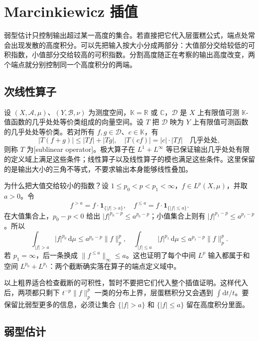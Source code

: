 \section{Marcinkiewicz 插值}
\label{b2:sec:1703}

弱型估计只控制输出超过某一高度的集合。若直接把它代入层蛋糕公式，端点处常会出现发散的高度积分。可以先把输入按大小分成两部分：大值部分交给较低的可积指数，小值部分交给较高的可积指数。分割高度随正在考察的输出高度改变，两个端点就分别控制同一个高度积分的两端。

\subsection{次线性算子}
\label{b2:subsec:170301}

设 \((X,\mathcal A,\mu)\)、\((Y,\mathcal B,\nu)\) 为测度空间，\(\mathbb K=\mathbb R\) 或 \(\mathbb C\)，\(\mathcal D\) 是 \(X\) 上有限值可测 \(\mathbb K\)-值函数的几乎处处等价类组成的向量空间。设 \(T\) 把 \(\mathcal D\) 映为 \(Y\) 上有限值可测函数的几乎处处等价类。若对所有 \(f,g\in\mathcal D\)、\(c\in\mathbb K\)，有
\[
 |T(f+g)|\leq |Tf|+|Tg|,
 \quad |T(cf)|=|c|\cdot|Tf|
 \quad\text{几乎处处},
\]
则称 \(T\) 为[sublinear operator]。极大算子在 \(L^1+L^\infty\) 等已保证输出几乎处处有限的定义域上满足这些条件；线性算子以及线性算子的模也满足这些条件。这里保留的是输出大小的三角不等式，不要求输出本身能够线性叠加。

\ProseParagraphBreak

为什么把大值交给较小的指数？设 \(1\leq p_0<p<p_1<\infty\)，\(f\in L^p(X,\mu)\)，并取 \(a>0\)。令
\[
 f^{>a}=f\cdot\mathbf1_{\{|f|>a\}},
 \quad f^{\leq a}=f\cdot\mathbf1_{\{|f|\leq a\}}.
\]
在大值集合上，\(p_0-p<0\) 给出 \(|f|^{p_0-p}\leq a^{p_0-p}\)；小值集合上则有 \(|f|^{p_1-p}\leq a^{p_1-p}\)。所以
\[
 \int_{|f|>a}|f|^{p_0}\,\mathrm d\mu
 \leq a^{p_0-p}\|f\|_p^p,
 \quad
 \int_{|f|\leq a}|f|^{p_1}\,\mathrm d\mu
 \leq a^{p_1-p}\|f\|_p^p.
\]
若 \(p_1=\infty\)，后一条换成 \(\|f^{\leq a}\|_\infty\leq a\)。这也证明了每个中间 \(L^p\) 输入都属于和空间 \(L^{p_0}+L^{p_1}\)：两个截断确实落在算子的端点定义域中。

\ProseParagraphBreak

以上粗界适合检查截断的可积性，暂时不要把它们代入整个插值证明。这样代入后，两项都只剩下 \(t^{-p}\|f\|_p^p\) 一类的分布上界，层蛋糕积分又会遇到 \(\int\mathrm dt/t\)。要保留比弱型更多的信息，必须让集合 \(\{|f|>a\}\) 和 \(\{|f|\leq a\}\) 留在高度积分里面。

\subsection{弱型估计}
\label{b2:subsec:170302}

